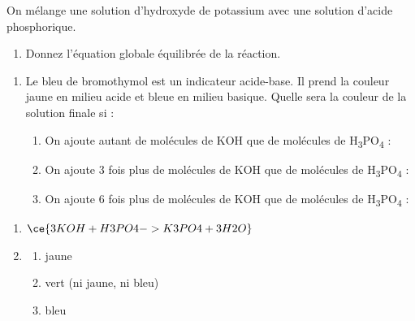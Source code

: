 \documentclass[
  11pt,
  french,
  a4paper,
  openany]{book}
\providecommand{\tightlist}{%
  \setlength{\itemsep}{0pt}\setlength{\parskip}{0pt}}
\begin{document}
\begin{Exercise}

On mélange une solution d'hydroxyde de potassium avec une solution d'acide phosphorique.

\begin{enumerate}
\def\labelenumi{\arabic{enumi}.}
\tightlist
\item
  Donnez l'équation globale équilibrée de la réaction.
\end{enumerate}

\vspace{2em}

\begin{enumerate}
\def\labelenumi{\arabic{enumi}.}
\setcounter{enumi}{1}
\item
  Le bleu de bromothymol est un indicateur acide-base. Il prend la couleur jaune en milieu acide et bleue en milieu basique. Quelle sera la couleur de la solution finale si :

  \begin{enumerate}
  \def\labelenumii{\alph{enumii}.}
  \tightlist
  \item
    On ajoute autant de molécules de KOH que de molécules de H\textsubscript{3}PO\textsubscript{4} :
  \item
    On ajoute 3 fois plus de molécules de KOH que de molécules de H\textsubscript{3}PO\textsubscript{4} :
  \item
    On ajoute 6 fois plus de molécules de KOH que de molécules de H\textsubscript{3}PO\textsubscript{4} :
  \end{enumerate}
\end{enumerate}


\end{Exercise}

\begin{Answer}

\begin{enumerate}
\def\labelenumi{\arabic{enumi}.}
\item
  \(\ce{ 3 KOH + H3PO4 -> K3PO4 + 3 H2O }\)
\item
  \begin{enumerate}
  \def\labelenumii{\alph{enumii}.}
  \tightlist
  \item
    jaune
  \item
    vert (ni jaune, ni bleu)
  \item
    bleu
  \end{enumerate}
\end{enumerate}


\end{Answer}
\end{document}
